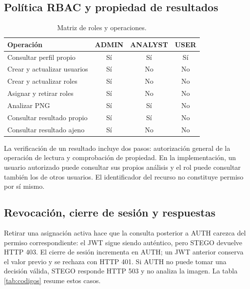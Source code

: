 \documentclass[11pt,a4paper,oneside]{article}
\newcommand{\code}[1]{{\footnotesize\texttt{\detokenize{#1}}}}
\begin{document}
\subsection{Política RBAC y propiedad de resultados}
\begin{table}[H]
\centering\small
\caption{Matriz de roles y operaciones.}
\begin{tabularx}{\textwidth}{@{}Y c c c@{}}\toprule
\textbf{Operación} & \textbf{ADMIN} & \textbf{ANALYST} & \textbf{USER}\\\midrule
Consultar perfil propio & Sí & Sí & Sí \\
Crear y actualizar usuarios & Sí & No & No \\
Crear y actualizar roles & Sí & No & No \\
Asignar y retirar roles & Sí & No & No \\
Analizar PNG & Sí & Sí & No \\
Consultar resultado propio & Sí & Sí & No \\
Consultar resultado ajeno & Sí & No & No \\
\bottomrule\end{tabularx}
\end{table}

La verificación de un resultado incluye dos pasos: autorización general de la operación de lectura y comprobación de propiedad. En la implementación, un usuario autorizado puede consultar sus propios análisis y el rol \code{ADMIN} puede consultar también los de otros usuarios. El identificador del recurso no constituye permiso por sí mismo.

\subsection{Revocación, cierre de sesión y respuestas}
Retirar una asignación activa hace que la consulta posterior a AUTH carezca del permiso correspondiente: el JWT sigue siendo auténtico, pero STEGO devuelve HTTP 403. El cierre de sesión incrementa \code{tokenVersion} en AUTH; un JWT anterior conserva el valor previo y se rechaza con HTTP 401. Si AUTH no puede tomar una decisión válida, STEGO responde HTTP 503 y no analiza la imagen. La tabla \ref{tab:codigos} resume estos casos.
\end{document}
